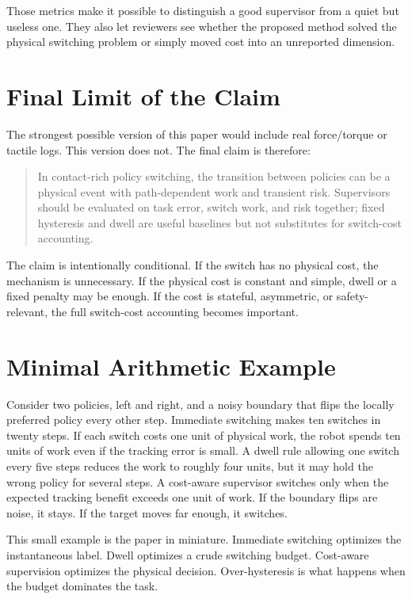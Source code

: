 \documentclass{article}
\begin{document}
Those metrics make it possible to distinguish a good supervisor from a quiet but useless one.
They also let reviewers see whether the proposed method solved the physical switching problem or simply moved cost into an unreported dimension.

\section{Final Limit of the Claim}

The strongest possible version of this paper would include real force/torque or tactile logs.
This version does not.
The final claim is therefore:

\begin{quote}
In contact-rich policy switching, the transition between policies can be a physical event with path-dependent work and transient risk. Supervisors should be evaluated on task error, switch work, and risk together; fixed hysteresis and dwell are useful baselines but not substitutes for switch-cost accounting.
\end{quote}

The claim is intentionally conditional.
If the switch has no physical cost, the mechanism is unnecessary.
If the physical cost is constant and simple, dwell or a fixed penalty may be enough.
If the cost is stateful, asymmetric, or safety-relevant, the full switch-cost accounting becomes important.

\section{Minimal Arithmetic Example}

Consider two policies, left and right, and a noisy boundary that flips the locally preferred policy every other step.
Immediate switching makes ten switches in twenty steps.
If each switch costs one unit of physical work, the robot spends ten units of work even if the tracking error is small.
A dwell rule allowing one switch every five steps reduces the work to roughly four units, but it may hold the wrong policy for several steps.
A cost-aware supervisor switches only when the expected tracking benefit exceeds one unit of work.
If the boundary flips are noise, it stays.
If the target moves far enough, it switches.

This small example is the paper in miniature.
Immediate switching optimizes the instantaneous label.
Dwell optimizes a crude switching budget.
Cost-aware supervision optimizes the physical decision.
Over-hysteresis is what happens when the budget dominates the task.
\end{document}
